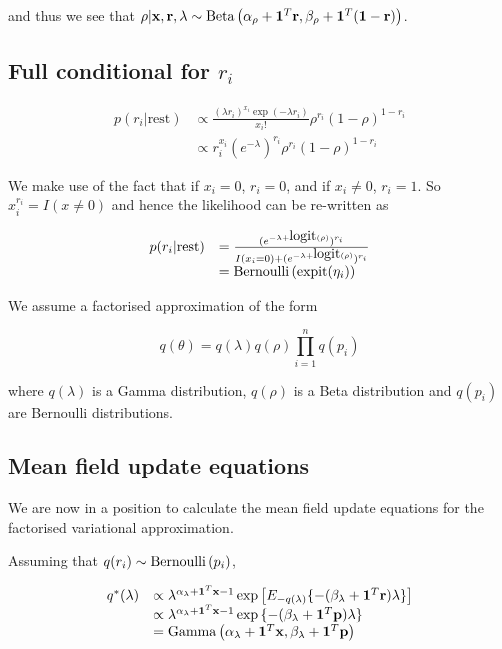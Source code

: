 \documentclass{amsart}
\begin{document}
and thus we see that $\rho | {\bf x}, {\bf r}, \lambda \sim {\text{Beta} \left( \alpha_\rho + {\bf1}^T {\bf r}, \beta_\rho + {\bf1}^T({\bf1}- {\bf r}) \right)}$.

\subsection{Full conditional for $r_i$}
$$
\begin{array}{ll}
p(r_i | \text{rest}) &\propto \frac{(\lambda r_i)^{x_i} \exp{(-\lambda r_i)}}{x_i !} \rho^{r_i} (1 - \rho)^{1 - r_i} \\
&\propto r_i^{x_i} (e^{-\lambda})^{r_i} \rho^{r_i} (1 - \rho)^{1 - r_i}
\end{array}
$$

We make use of the fact that if $x_i = 0$, $r_i = 0$, and if $x_i \ne 0$,
$r_i = 1$. So $x_i^{r_i} = I(x \ne 0)$ and hence the likelihood can be re-written as

$$
\begin{array}{ll}
p(r_i | \text{rest}) &= \frac{(e^{-\lambda + \mbox{logit}{(\rho)}})^{r_i}}{I(x_i = 0) + (e^{-\lambda + \mbox{logit}{(\rho)}})^{r_i}} \\
&= {\text{Bernoulli} \left( \text{expit}(\eta_i) \right)}
\end{array}
$$


We assume a factorised approximation of the form

$$
q(\theta) = q(\lambda) q(\rho) \prod_{i=1}^n q(p_i)
$$

where $q(\lambda)$ is a Gamma distribution, $q(\rho)$ is a Beta distribution and
$q(p_i)$ are Bernoulli distributions.


\subsection{Mean field update equations}
We are now in a position to calculate the mean field update equations for the factorised
variational approximation.

Assuming that $q(r_i) \sim {\text{Bernoulli} \left( p_i \right)}$,

$$
\begin{array}{ll}
q^*(\lambda) &\propto \lambda^{\alpha_\lambda+{\bf 1}^T{\bf x} - 1} \exp{\left[ E_{-q(\lambda)} \{-(\beta_\lambda + {\bf1}^T{\bf r}) \lambda \} \right]} \\
&\propto \lambda^{\alpha_\lambda+{\bf 1}^T{\bf x} - 1} \exp{\{-(\beta_\lambda + {\bf1}^T{\bf p})\lambda \} } \\
&= {\text{Gamma} \left( \alpha_\lambda+{\bf 1}^T{\bf x}, \beta_\lambda+{\bf 1}^T{\bf p} \right)}
\end{array}
$$
\end{document}

